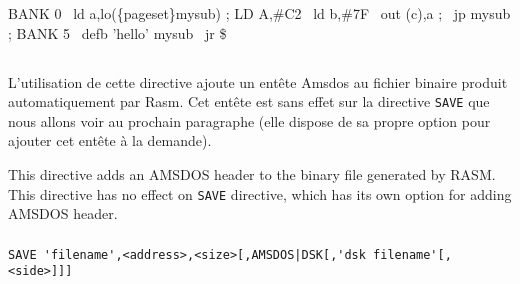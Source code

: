 \begin{code}
BANK 0
\  ld a,lo(\{pageset\}mysub) ; LD A,\#C2
\  ld b,\#7F
\  out (c),a           ; 
\  jp mysub            ; 
\medskip
BANK 5
\  defb 'hello'
mysub
\  jr \$
\end{code}

\subsection{}

\subsubsection{}

\begin{xfr}
L'utilisation de cette directive ajoute un entête Amsdos au fichier binaire produit automatiquement par Rasm. Cet entête est sans effet sur la directive \texttt{SAVE} que nous allons voir au prochain paragraphe (elle dispose de sa propre option pour ajouter cet entête à la demande).
\end{xfr}

\begin{xen}
This directive adds an AMSDOS header to the binary file generated by RASM. 
This directive has no effect on \texttt{SAVE} directive, which has its own option for adding AMSDOS header.
\end{xen}

\subsubsection{}

\begin{verbatim}
SAVE 'filename',<address>,<size>[,AMSDOS|DSK[,'dsk filename'[,<side>]]]
\end{verbatim}

